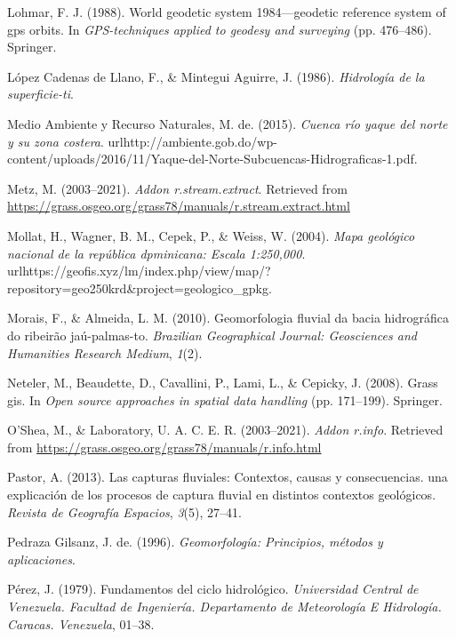 \documentclass[11pt,]{article}
\begin{document}
\hypertarget{ref-lohmar1988world}{}
Lohmar, F. J. (1988). World geodetic system 1984---geodetic reference
system of gps orbits. In \emph{GPS-techniques applied to geodesy and
surveying} (pp. 476--486). Springer.

\hypertarget{ref-lopez1986hidrologia}{}
López Cadenas de Llano, F., \& Mintegui Aguirre, J. (1986).
\emph{Hidrología de la superficie-ti}.

\hypertarget{ref-Mmar2015cuenca}{}
Medio Ambiente y Recurso Naturales, M. de. (2015). \emph{Cuenca río
yaque del norte y su zona costera}.
urlhttp://ambiente.gob.do/wp-content/uploads/2016/11/Yaque-del-Norte-Subcuencas-Hidrograficas-1.pdf.

\hypertarget{ref-streamnextractmarkus}{}
Metz, M. (2003--2021). \emph{Addon r.stream.extract}. Retrieved from
\url{https://grass.osgeo.org/grass78/manuals/r.stream.extract.html}

\hypertarget{ref-Mollat2004mapa}{}
Mollat, H., Wagner, B. M., Cepek, P., \& Weiss, W. (2004). \emph{Mapa
geológico nacional de la república dpminicana: Escala 1:250,000}.
urlhttps://geofis.xyz/lm/index.php/view/map/?repository=geo250krd\&project=geologico\_gpkg.

\hypertarget{ref-morais2010geomorfologia}{}
Morais, F., \& Almeida, L. M. (2010). Geomorfologia fluvial da bacia
hidrográfica do ribeirão jaú-palmas-to. \emph{Brazilian Geographical
Journal: Geosciences and Humanities Research Medium}, \emph{1}(2).

\hypertarget{ref-neteler2008grass}{}
Neteler, M., Beaudette, D., Cavallini, P., Lami, L., \& Cepicky, J.
(2008). Grass gis. In \emph{Open source approaches in spatial data
handling} (pp. 171--199). Springer.

\hypertarget{ref-rinfo}{}
O'Shea, M., \& Laboratory, U. A. C. E. R. (2003--2021). \emph{Addon
r.info}. Retrieved from
\url{https://grass.osgeo.org/grass78/manuals/r.info.html}

\hypertarget{ref-pastor2013capturas}{}
Pastor, A. (2013). Las capturas fluviales: Contextos, causas y
consecuencias. una explicación de los procesos de captura fluvial en
distintos contextos geológicos. \emph{Revista de Geografía Espacios},
\emph{3}(5), 27--41.

\hypertarget{ref-pedraza1996geomorfologia}{}
Pedraza Gilsanz, J. de. (1996). \emph{Geomorfología: Principios, métodos
y aplicaciones}.

\hypertarget{ref-perez1979fundamentos}{}
Pérez, J. (1979). Fundamentos del ciclo hidrológico. \emph{Universidad
Central de Venezuela. Facultad de Ingeniería. Departamento de
Meteorología E Hidrología. Caracas. Venezuela}, 01--38.
\end{document}
